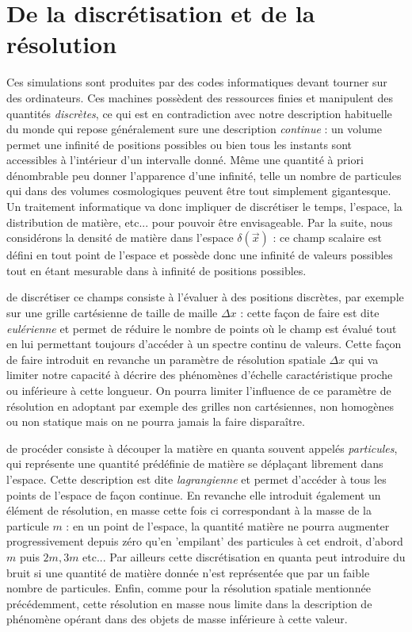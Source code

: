 \section{De la discrétisation et de la résolution}
Ces simulations sont produites par des codes informatiques devant tourner sur des ordinateurs. Ces machines possèdent des ressources finies et manipulent des quantités \textit{discrètes}, ce qui est en contradiction avec notre description habituelle du monde qui repose généralement sure une description \textit{continue} : un volume permet une infinité de positions possibles ou bien tous les instants sont accessibles à l'intérieur d'un intervalle donné. Même une quantité à priori dénombrable peu donner l'apparence d'une infinité, telle un nombre de particules qui dans des volumes cosmologiques peuvent être tout simplement gigantesque. Un traitement informatique va donc impliquer de discrétiser le temps, l'espace, la distribution de matière, etc... pour pouvoir être envisageable.
Par la suite, nous considérons la densité de matière dans l'espace $\delta(\vec x)$ : ce champ scalaire est défini en tout point de l'espace et possède donc une infinité de valeurs possibles tout en étant mesurable dans à infinité de positions possibles. 

 de discrétiser ce champs consiste à l'évaluer à des positions discrètes, par exemple sur une grille cartésienne de taille de maille $\Delta x$ : cette façon de faire est dite \textit{eulérienne} et permet de réduire le nombre de points où le champ est évalué tout en lui permettant toujours d'accéder à un spectre continu de valeurs. Cette façon de faire introduit en revanche un paramètre de résolution spatiale $\Delta x$ qui va limiter notre capacité à décrire des phénomènes d'échelle caractéristique proche ou inférieure à cette longueur. On pourra limiter l'influence de ce paramètre de résolution en adoptant par exemple des grilles non cartésiennes, non homogènes ou non statique mais on ne pourra jamais la faire disparaître.

 de procéder consiste à découper la matière en quanta souvent appelés \textit{particules}, qui représente une quantité prédéfinie de matière se déplaçant librement dans l'espace. Cette description est dite \textit{lagrangienne} et permet d'accéder à tous les points de l'espace de façon continue. En revanche elle introduit également un élément de résolution, en masse cette fois ci correspondant à la masse de la particule $m$ : en un point de l'espace, la quantité matière ne pourra augmenter progressivement depuis zéro qu'en 'empilant' des particules à cet endroit, d'abord $m$ puis $2m,3m$ etc... Par ailleurs cette discrétisation en quanta peut introduire du bruit si une quantité de matière donnée n'est représentée que par un faible nombre de particules. Enfin, comme pour la résolution spatiale mentionnée précédemment, cette résolution en masse nous limite dans la description de phénomène opérant dans des objets de masse inférieure à cette valeur.

